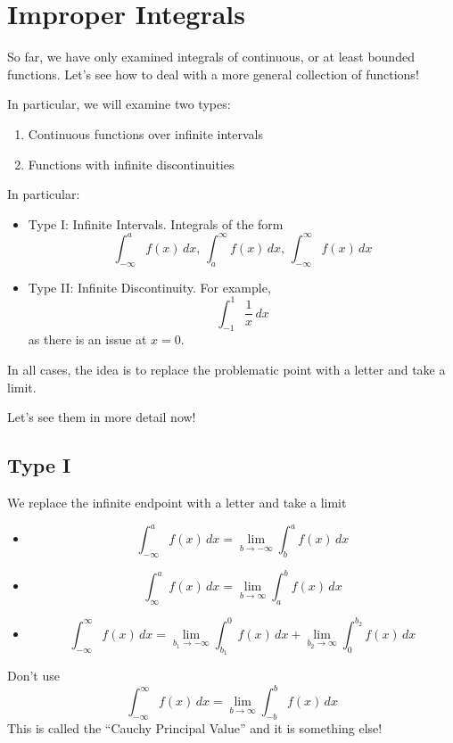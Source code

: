 \section{Improper Integrals}
So far, we have only examined integrals of continuous, or at
least bounded functions. Let's see how to deal with a more general
collection of functions!

In particular, we will examine two types:
\begin{enumerate}[label=(\arabic*)]
    \item Continuous functions over infinite intervals
    \item Functions with infinite discontinuities
\end{enumerate}

In particular:
\begin{itemize}
    \item Type I\@: Infinite Intervals. Integrals of the form
          \[ \int_{-\infty}^{a} f(x)\, d{x},\,\int_{a}^{\infty} f(x)\, d{x},\,
              \int_{-\infty}^{\infty} f(x)\, d{x} \]
    \item Type II\@: Infinite Discontinuity. For example,
          \[ \int_{-1}^{1} \frac{1}{x} \, d{x}  \]
          as there is an issue at $ x=0 $.
\end{itemize}

In all cases, the idea is to replace the problematic point with a
letter and take a limit.

Let's see them in more detail now!

\subsection{Type I}
We replace the infinite endpoint with a letter and take a limit
\begin{itemize}
    \item \[ \int_{-\infty}^{a} f(x)\, d{x} =\lim\limits_{{b} \to {-\infty}}
              \int_{b}^{a} f(x)\, d{x} \]
    \item \[ \int_{\infty}^{a} f(x)\, d{x} =\lim\limits_{{b} \to {\infty}}
              \int_{a}^{b} f(x)\, d{x} \]
    \item \[ \int_{-\infty}^{\infty} f(x)\, d{x}=
              \lim\limits_{{b_1} \to {-\infty}} \int_{b_1}^{0} f(x)\, d{x}+
              \lim\limits_{{b_2} \to {\infty}} \int_{0}^{b_2} f(x)\, d{x}  \]
\end{itemize}
Don't use
\[ \int_{-\infty}^{\infty} f(x)\, d{x}=\lim\limits_{{b} \to {\infty}}
    \int_{-b}^{b} f(x)\, d{x}  \]
This is called the ``Cauchy Principal Value'' and it is something else!


